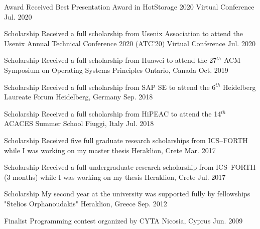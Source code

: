 

\begin{cvhonors}

  \cvhonor
    {Award} %
    {Received Best Presentation Award in HotStorage 2020} %
    {Virtual Conference} %
    {Jul. 2020} %

  \cvhonor
    {Scholarship} %
    {Received a full scholarship from Usenix Association to attend the
    Usenix Annual Technical Conference 2020 (ATC'20)} %
    {Virtual Conference} %
    {Jul. 2020} %

  \cvhonor
    {Scholarship} %
    {Received a full scholarship from Huawei to attend the 27$^{th}$
    ACM Symposium on Operating Systems Principles} %
    {Ontario, Canada} %
    {Oct. 2019} %

  \cvhonor
    {Scholarship} %
    {Received a full scholarship from SAP SE to attend the 6$^{th}$
    Heidelberg Laureate Forum} %
    {Heidelberg, Germany} %
    {Sep. 2018} %

  \cvhonor
    {Scholarship} %
    {Received a full scholarship from HiPEAC to attend the 14$^{th}$
    ACACES Summer School} %
    {Fiuggi, Italy} %
    {Jul. 2018} %

  \cvhonor
    {Scholarship} %
    {Received five full graduate research scholarships from ICS--FORTH
     while I was working on my master thesis} %
    {Heraklion, Crete} %
    {Mar. 2017} %

  \cvhonor
    {Scholarship} %
    {Received a full undergraduate research scholarship from
    ICS--FORTH (3 months) while I was working on my thesis} %
    {Heraklion, Crete} %
    {Jul. 2017} %
  
  \cvhonor
    {Scholarship} %
    {My second year at the university was supported fully by
          fellowships "Stelios Orphanoudakis"} %
    {Heraklion, Greece} %
    {Sep. 2012} %

  \cvhonor
    {Finalist} %
    {Programming contest organized by CYTA} %
    {Nicosia, Cyprus} %
    {Jun. 2009} %

\end{cvhonors}
